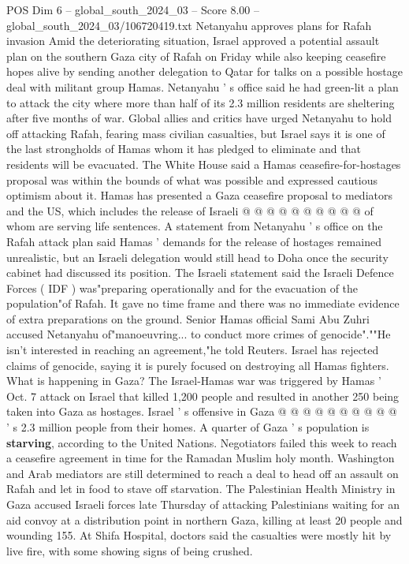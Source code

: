 \begin{textsample}{POS Dim 6 – global\_south\_2024\_03 – Score 8.00 – global\_south\_2024\_03/106720419.txt}
Netanyahu approves plans for Rafah invasion Amid the deteriorating situation, Israel approved a potential assault plan on the southern Gaza city of Rafah on Friday while also keeping ceasefire hopes alive by sending another delegation to Qatar for talks on a possible hostage deal with militant group Hamas.
Netanyahu ' s office said he had green-lit a plan to attack the city where more than half of its 2.3 million residents are sheltering after five months of war.
Global allies and critics have urged Netanyahu to hold off attacking Rafah, fearing mass civilian casualties, but Israel says it is one of the last strongholds of Hamas whom it has pledged to eliminate and that residents will be evacuated.
The White House said a Hamas ceasefire-for-hostages proposal was within the bounds of what was possible and expressed cautious optimism about it.
Hamas has presented a Gaza ceasefire proposal to mediators and the US, which includes the release of Israeli @ @ @ @ @ @ @ @ @ @ of whom are serving life sentences.
A statement from Netanyahu ' s office on the Rafah attack plan said Hamas ' demands for the release of hostages remained unrealistic, but an Israeli delegation would still head to Doha once the security cabinet had discussed its position.
The Israeli statement said the Israeli Defence Forces ( IDF ) was"preparing operationally and for the evacuation of the population"of Rafah.
It gave no time frame and there was no immediate evidence of extra preparations on the ground.
Senior Hamas official Sami Abu Zuhri accused Netanyahu of"manoeuvring... to conduct more crimes of genocide".""He isn't interested in reaching an agreement,"he told Reuters.
Israel has rejected claims of genocide, saying it is purely focused on destroying all Hamas fighters.
What is happening in Gaza?
The Israel-Hamas war was triggered by Hamas ' Oct. 7 attack on Israel that killed 1,200 people and resulted in another 250 being taken into Gaza as hostages.
Israel ' s offensive in Gaza @ @ @ @ @ @ @ @ @ @ ' s 2.3 million people from their homes.
A quarter of Gaza ' s population is \textbf{starving}, according to the United Nations.
Negotiators failed this week to reach a ceasefire agreement in time for the Ramadan Muslim holy month.
Washington and Arab mediators are still determined to reach a deal to head off an assault on Rafah and let in food to stave off starvation.
The Palestinian Health Ministry in Gaza accused Israeli forces late Thursday of attacking Palestinians waiting for an aid convoy at a distribution point in northern Gaza, killing at least 20 people and wounding 155.
At Shifa Hospital, doctors said the casualties were mostly hit by live fire, with some showing signs of being crushed.

\end{textsample}
